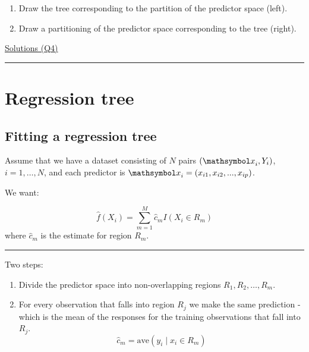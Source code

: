 \documentclass[
  letterpaper,
  DIV=11,
  numbers=noendperiod]{scrartcl}
\providecommand{\tightlist}{%
  \setlength{\itemsep}{0pt}\setlength{\parskip}{0pt}}\usepackage{longtable,booktabs,array}
\begin{document}
\begin{enumerate}
\def\labelenumi{\arabic{enumi})}
\item
  Draw the tree corresponding to the partition of the predictor space
  (left).
\item
  Draw a partitioning of the predictor space corresponding to the tree
  (right).
\end{enumerate}

\href{https://rstudio-pubs-static.s3.amazonaws.com/65564_925dfde884e14ef9b5735eddd16c263e.html}{Solutions
(Q4)}

\begin{center}\rule{0.5\linewidth}{0.5pt}\end{center}

\hypertarget{regression-tree}{%
\section{Regression tree}\label{regression-tree}}

\hypertarget{fitting-a-regression-tree}{%
\subsection{Fitting a regression tree}\label{fitting-a-regression-tree}}

Assume that we have a dataset consisting of \(N\) pairs
\(({\mathsymbol x}_i,Y_i)\), \(i=1,\ldots,N\), and each predictor is
\({\mathsymbol x}_i=(x_{i1},x_{i2},...,x_{ip})\).

We want:

\[\hat{f}(X_i)=\sum_{m=1}^M \hat{c}_m I(X_i \in R_m)\] where
\(\hat{c}_m\) is the estimate for region \(R_m\).

\begin{center}\rule{0.5\linewidth}{0.5pt}\end{center}

Two steps:

\begin{enumerate}
\def\labelenumi{\arabic{enumi}.}
\tightlist
\item
  Divide the predictor space into non-overlapping regions
  \(R_1,R_2,\ldots,R_m\).
\item
  For every observation that falls into region \(R_j\) we make the same
  prediction - which is the mean of the responses for the training
  observations that fall into \(R_j\).
  \[\hat{c}_m=\text{ave}(y_i \mid x_i \in R_m)\]
\end{enumerate}
\end{document}
